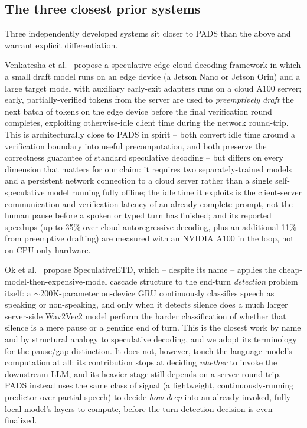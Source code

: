 \documentclass[journal]{IEEEtran}
\begin{document}
\subsection{The three closest prior systems}
Three independently developed systems sit closer to PADS than the above and warrant explicit differentiation.

Venkatesha et al.~\cite{venkatesha2025edgecloud} propose a speculative edge-cloud decoding framework in which a small draft model runs on an edge device (a Jetson Nano or Jetson Orin) and a large target model with auxiliary early-exit adapters runs on a cloud A100 server; early, partially-verified tokens from the server are used to \emph{preemptively draft} the next batch of tokens on the edge device before the final verification round completes, exploiting otherwise-idle client time during the network round-trip. This is architecturally close to PADS in spirit -- both convert idle time around a verification boundary into useful precomputation, and both preserve the correctness guarantee of standard speculative decoding -- but differs on every dimension that matters for our claim: it requires two separately-trained models and a persistent network connection to a cloud server rather than a single self-speculative model running fully offline; the idle time it exploits is the client-server communication and verification latency of an already-complete prompt, not the human pause before a spoken or typed turn has finished; and its reported speedups (up to 35\% over cloud autoregressive decoding, plus an additional 11\% from preemptive drafting) are measured with an NVIDIA A100 in the loop, not on CPU-only hardware.

Ok et al.~\cite{ok2025speculativeetd} propose SpeculativeETD, which -- despite its name -- applies the cheap-model-then-expensive-model cascade structure to the end-turn \emph{detection} problem itself: a $\sim$200K-parameter on-device GRU continuously classifies speech as speaking or non-speaking, and only when it detects silence does a much larger server-side Wav2Vec2 model perform the harder classification of whether that silence is a mere pause or a genuine end of turn. This is the closest work by name and by structural analogy to speculative decoding, and we adopt its terminology for the pause/gap distinction. It does not, however, touch the language model's computation at all: its contribution stops at deciding \emph{whether} to invoke the downstream LLM, and its heavier stage still depends on a server round-trip. PADS instead uses the same class of signal (a lightweight, continuously-running predictor over partial speech) to decide \emph{how deep} into an already-invoked, fully local model's layers to compute, before the turn-detection decision is even finalized.
\end{document}
